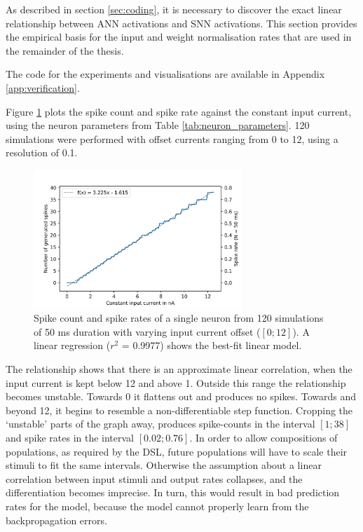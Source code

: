 
As described in section \ref{sec:coding}, it is necessary to discover the exact
linear relationship between \gls{ANN} activations and \gls{SNN} activations. This section provides the empirical basis for the input and weight normalisation
rates that are used in the remainder of the thesis.

The code for the experiments and visualisations are available in Appendix
\ref{app:verification}.

Figure \ref{fig:spike_rates} plots the spike count and spike rate against the
constant input current, using the neuron parameters from Table \ref{tab:neuron_parameters}.
120 simulations were performed with offset currents ranging from 0 to 12, 
using a resolution of 0.1.

\begin{figure}
  \centering
  \includegraphics[width=0.7\textwidth]{images/spike_rate.png}
  \caption{Spike count and spike rates of a single neuron from 120 simulations of 50 ms
    duration with varying input current offset ($[0;12]$).
  A linear regression ($r^2$ = 0.9977) shows the best-fit linear model.}
  \label{fig:spike_rates}
\end{figure}

The relationship shows that there is an approximate linear correlation, when the
input current is kept below 12 and above 1. 
Outside this range the relationship becomes unstable. Towards 0 it flattens out and
produces no spikes. Towards and beyond 12, it begins to resemble a non-differentiable 
step function.
Cropping the `unstable' parts of the graph away, produces spike-counts in the interval
$[1;38]$ and spike rates in the interval $[0.02;0.76]$.
In order to allow compositions of populations, as required by the \gls{DSL},
future populations will have to scale their stimuli to fit the same intervals.
Otherwise the assumption about a linear correlation between input stimuli and
output rates collapses, and the differentiation becomes imprecise.
In turn, this would result in bad prediction rates for the model, because the model
cannot properly learn from the backpropagation errors.

